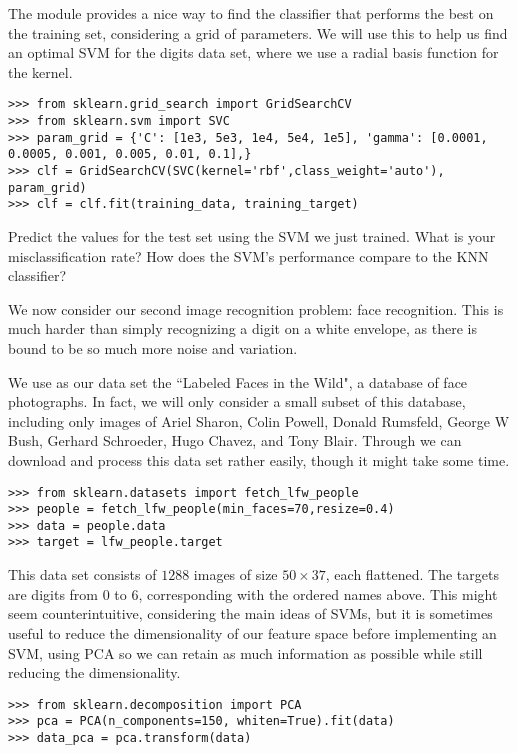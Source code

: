 The module  provides a nice way to find the classifier that performs the best on the training set, considering a grid of parameters. We will use this to help us find an optimal SVM for the digits data set, where we use a radial basis function for the kernel.
\begin{lstlisting}
>>> from sklearn.grid_search import GridSearchCV
>>> from sklearn.svm import SVC
>>> param_grid = {'C': [1e3, 5e3, 1e4, 5e4, 1e5], 'gamma': [0.0001, 0.0005, 0.001, 0.005, 0.01, 0.1],}
>>> clf = GridSearchCV(SVC(kernel='rbf',class_weight='auto'), param_grid)
>>> clf = clf.fit(training_data, training_target)
\end{lstlisting}

\begin{problem}
Predict the values for the test set using the SVM we just trained. What is your misclassification rate? How does the SVM's performance compare to the KNN classifier?
\end{problem}

We now consider our second image recognition problem: face recognition. This is much harder than simply recognizing a digit on a white envelope, as there is bound to be so much more noise and variation.

We use as our data set the ``Labeled Faces in the Wild", a database of face photographs. In fact, we will only consider a small subset of this database, including only images of Ariel Sharon, Colin Powell, Donald Rumsfeld, George W Bush, Gerhard Schroeder, Hugo Chavez, and Tony Blair. Through  we can download and process this data set rather easily, though it might take some time.
\begin{lstlisting}
>>> from sklearn.datasets import fetch_lfw_people
>>> people = fetch_lfw_people(min_faces=70,resize=0.4)
>>> data = people.data
>>> target = lfw_people.target
\end{lstlisting}

This data set consists of $1288$ images of size $50 \times 37$, each flattened. The targets are digits from $0$ to $6$, corresponding with the ordered names above. This might seem counterintuitive, considering the main ideas of SVMs, but it is sometimes useful to reduce the dimensionality of our feature space before implementing an SVM, using PCA so we can retain as much information as possible while still reducing the dimensionality.
\begin{lstlisting}
>>> from sklearn.decomposition import PCA
>>> pca = PCA(n_components=150, whiten=True).fit(data)
>>> data_pca = pca.transform(data)
\end{lstlisting}

